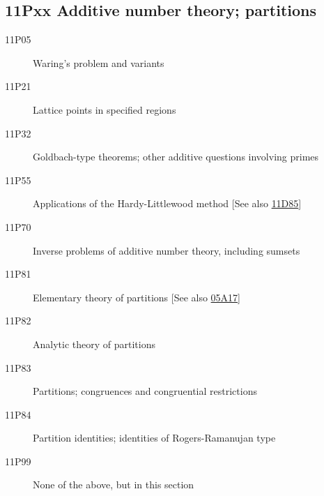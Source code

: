 \documentclass[letterpaper]{article}
\begin{document}
\subsection*{11Pxx  Additive number theory; partitions }\label{11Pxx}
\begin{description}  
\item [11P05]\label{11P05} Waring's problem and variants
\item [11P21]\label{11P21} Lattice points in specified regions
\item [11P32]\label{11P32} Goldbach-type theorems; other additive questions involving primes
\item [11P55]\label{11P55} Applications of the Hardy-Littlewood method [See also \hyperref[11D85]{11D85}]
\item [11P70]\label{11P70} Inverse problems of additive number theory, including sumsets
\item [11P81]\label{11P81} Elementary theory of partitions [See also \hyperref[05A17]{05A17}]
\item [11P82]\label{11P82} Analytic theory of partitions
\item [11P83]\label{11P83} Partitions; congruences and congruential restrictions
\item [11P84]\label{11P84} Partition identities; identities of Rogers-Ramanujan type
\item [11P99]\label{11P99} None of the above, but in this section
\end{description}
\end{document}
